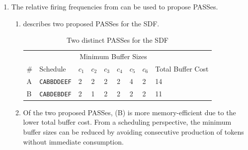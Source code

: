 \documentclass{article}
\newcommand\mma[1]%
    {\href{https://reference.wolfram.com/language/ref/#1.html}{\textbf{#1}}}
\numberwithin{equation}{section}
\numberwithin{table}{section}
\numberwithin{figure}{section}
\begin{document}
\begin{enumerate}
\begin{enumerate}
            Since the minimised coefficients map exactly to the null space of
            $\Gamma$, the \emph{Mathematica} \mma{NullSpace} function was used
            to compute the results in .
    \end{enumerate}
    \item The relative firing frequencies from  can be
        used to propose PASSes.
        \begin{enumerate}
            \item {} describes two proposed PASSes for the SDF.
                \begin{table}
                    \centering%
                    \begin{tabular}{l|llllllll}
                        & & \multicolumn{6}{c}{Minimum Buffer Sizes} & \\
                        \# & Schedule & $c_1$ & $c_2$ & $c_3$ & $c_4$ & $c_5$ &
                            $c_6$ & Total Buffer Cost \\
                        \toprule
                        A & \texttt{CABBDDEEF} & 2 & 2 & 2 & 2 & 4 & 2 & 14 \\
                        B & \texttt{CABDEBDEF} & 2 & 1 & 2 & 2 & 2 & 2 & 11 \\
                        \bottomrule
                    \end{tabular}
                    \caption{Two distinct PASSes for the SDF}%
                    \label{table:passes}
                \end{table}
            \item Of the two proposed PASSes, (B) is more memory-efficient due
                to the lower total buffer cost. From a scheduling perspective,
                the minimum buffer sizes can be reduced by avoiding consecutive
                production of tokens without immediate consumption.
        \end{enumerate}
\end{enumerate}
\end{document}
